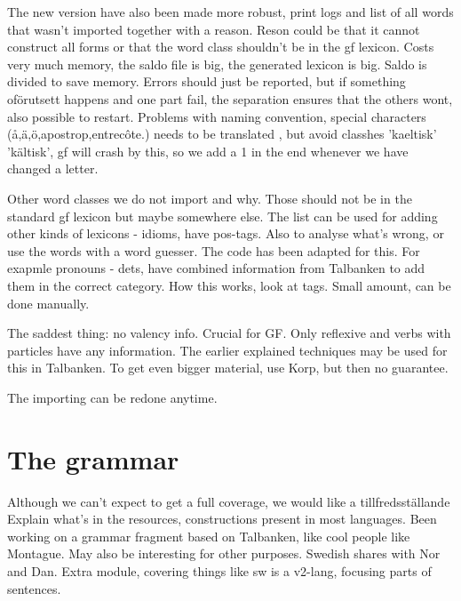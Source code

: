 \documentclass{report}
\begin{document}
The new version have also been made more robust, print logs and list of all
words that wasn't imported together with a reason. Reson could be that it
cannot construct all forms or that the word class shouldn't be in the gf lexicon.
Costs very much memory, the saldo file is big, the generated lexicon is big.
Saldo is divided to save memory. Errors should just be reported, but if something oförutsett
happens and one part fail, the separation ensures that the others wont, also
possible to restart. Problems with naming convention, special
characters (å,ä,ö,apostrop,entrecôte.) needs to be translated , but avoid
classhes 'kaeltisk' 'kältisk', gf will crash by this, so we add a 1
in the end whenever we have changed a letter.

Other word classes we do not import and why.
Those should not be in the standard gf lexicon but maybe somewhere else.
The list can be used for adding other kinds of lexicons - idioms, have pos-tags.
Also to analyse what's wrong, or use the words with a word guesser. The code
has been adapted for this.
For exapmle pronouns - dets, have combined information from Talbanken to add them in the correct
category. How this works, look at tags. Small amount, can be done manually.

The saddest thing: no valency info. Crucial for GF. Only reflexive and verbs with particles
have any information. The earlier explained techniques may be used for this in Talbanken.
To get even bigger material, use Korp, but then no guarantee.

The importing can be redone anytime.

\section{The grammar}
Although we can't expect to get a full coverage, we would like a tillfredsställande
Explain what's in the resources, constructions present in most languages. 
Been working on a grammar fragment based on Talbanken,
like cool people like Montague. May also be interesting for other purposes.
Swedish shares with Nor and Dan. Extra module, covering things like sw is a
v2-lang, focusing parts of sentences. 
\end{document}
